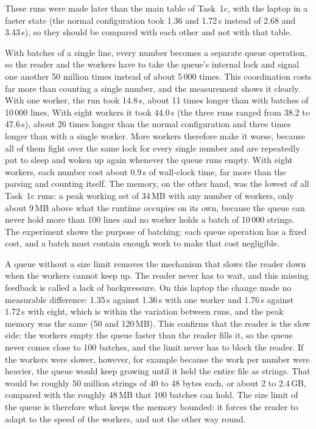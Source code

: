 \documentclass[11pt,a4paper]{article}
\begin{document}
These runs were made later than the main table of Task~1c, with the laptop in a faster state (the
normal configuration took 1.36 and 1.72\,s instead of 2.68 and 3.43\,s), so they should be compared
with each other and not with that table.

With batches of a single line, every number becomes a separate queue operation, so the reader and
the workers have to take the queue's internal lock and signal one another 50 million times instead of
about 5\,000 times. This coordination costs far more than counting a single number, and the
measurement shows it clearly. With one worker, the run took 14.8\,s, about 11 times longer than with
batches of 10\,000 lines. With eight workers it took 44.0\,s (the three runs ranged from 38.2 to
47.6\,s), about 26 times longer than the normal configuration and three times longer than with a
single worker. More workers therefore make it worse, because all of them fight over the same lock for
every single number and are repeatedly put to sleep and woken up again whenever the queue runs empty.
With eight workers, each number cost about 0.9\,\textmu s of wall-clock time, far more than the parsing
and counting itself. The memory, on the other hand, was the lowest of all Task~1c runs: a peak working
set of 34\,MB with any number of workers, only about 9\,MB above what the runtime occupies on its own,
because the queue can never hold more than 100 lines and no worker holds a batch of 10\,000 strings.
The experiment shows the purpose of batching: each queue operation has a fixed cost, and a batch must
contain enough work to make that cost negligible.

A queue without a size limit removes the mechanism that slows the reader down when the workers
cannot keep up. The reader never has to wait, and this missing feedback is called a lack of
backpressure. On this laptop the change made no measurable difference: 1.35\,s against 1.36\,s with
one worker and 1.76\,s against 1.72\,s with eight, which is within the variation between runs, and the
peak memory was the same (50 and 120\,MB). This confirms that the reader is the slow side: the
workers empty the queue faster than the reader fills it, so the queue never comes close to 100
batches, and the limit never has to block the reader. If the workers were slower, however, for
example because the work per number were heavier, the queue would keep growing until it held the
entire file as strings. That would be roughly 50 million strings of 40 to 48 bytes each, or about 2
to 2.4\,GB, compared with the roughly 48\,MB that 100 batches can hold. The size limit of the queue is
therefore what keeps the memory bounded: it forces the reader to adapt to the speed of the workers,
and not the other way round.
\end{document}
